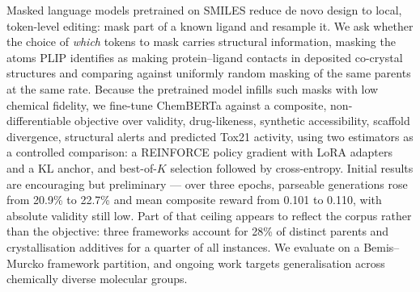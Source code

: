 
Masked language models pretrained on SMILES reduce de novo design to local,
token-level editing: mask part of a known ligand and resample it. We ask
whether the choice of \emph{which} tokens to mask carries structural
information, masking the atoms PLIP identifies as making protein--ligand
contacts in deposited co-crystal structures and comparing against uniformly
random masking of the same parents at the same rate. Because the pretrained
model infills such masks with low chemical fidelity, we fine-tune ChemBERTa
against a composite, non-differentiable objective over validity, drug-likeness,
synthetic accessibility, scaffold divergence, structural alerts and predicted
Tox21 activity, using two estimators as a controlled comparison: a REINFORCE
policy gradient with LoRA adapters and a KL anchor, and best-of-$K$ selection
followed by cross-entropy. Initial results are encouraging but preliminary ---
over three epochs, parseable generations rose from 20.9\% to 22.7\% and mean
composite reward from 0.101 to 0.110, with absolute validity still low. Part of
that ceiling appears to reflect the corpus rather than the objective: three
frameworks account for 28\% of distinct parents and crystallisation additives
for a quarter of all instances. We evaluate on a Bemis--Murcko framework
partition, and ongoing work targets generalisation across chemically diverse
molecular groups.
